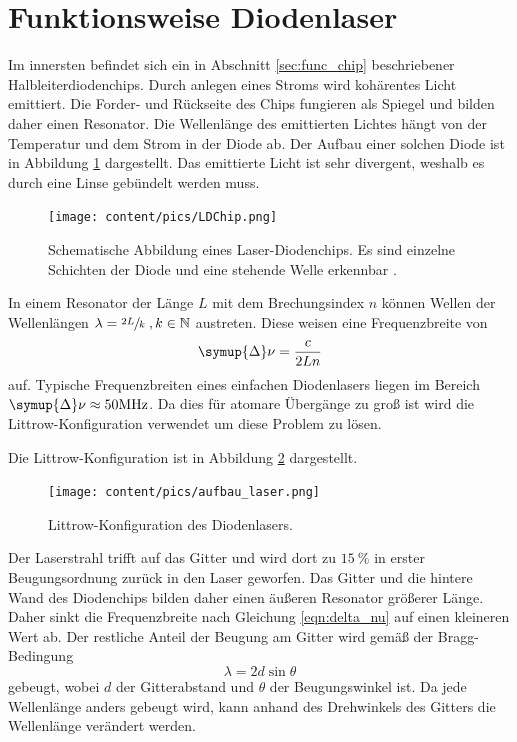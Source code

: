 \section{Funktionsweise Diodenlaser}
\label{sec:func_dio}

Im innersten befindet sich ein in Abschnitt \ref{sec:func_chip} beschriebener Halbleiterdiodenchips. Durch anlegen eines Stroms wird kohärentes Licht emittiert. Die Forder- und 
Rückseite des Chips fungieren als Spiegel und bilden daher einen Resonator. Die Wellenlänge des emittierten Lichtes hängt von der Temperatur und dem Strom in der Diode ab. Der
Aufbau einer solchen Diode ist in Abbildung \ref{fig:LDChip} dargestellt. Das emittierte Licht ist sehr divergent, weshalb es durch eine Linse gebündelt werden muss. 

\begin{figure}
    \centering
    \texttt{[image: content/pics/LDChip.png]}
    \caption{Schematische Abbildung eines Laser-Diodenchips. Es sind einzelne Schichten der Diode und eine stehende Welle erkennbar \cite{diode_laser_spectroscopy}.}
    \label{fig:LDChip}
\end{figure}

In einem Resonator der Länge $L$ mit dem Brechungsindex $n$ können Wellen der Wellenlängen $\lambda = \sfrac{2L}{k}  \;,k \in \mathbb{N}$ austreten. Diese weisen eine Frequenzbreite 
von 
\begin{equation}
    \label{eqn:delta_nu}
    \symup{\Delta} \nu = \frac{c}{2Ln}
\end{equation}
auf. Typische Frequenzbreiten eines einfachen Diodenlasers liegen im Bereich $\symup{\Delta} \nu \approx 50 \unit{\mega\hertz}$. Da dies für atomare Übergänge zu groß ist wird 
die Littrow-Konfiguration verwendet um diese Problem zu lösen. 

Die Littrow-Konfiguration ist in Abbildung \ref{fig:littrow} dargestellt.
\begin{figure}
    \centering
    \texttt{[image: content/pics/aufbau\_laser.png]}
    \caption{Littrow-Konfiguration des Diodenlasers. \cite{diode_laser_spectroscopy}}
    \label{fig:littrow}
\end{figure}
Der Laserstrahl trifft auf das Gitter und wird dort zu $\qty{15}{\percent}$ in erster Beugungsordnung zurück in den Laser geworfen. Das Gitter und die hintere Wand des Diodenchips 
bilden daher einen äußeren Resonator größerer Länge. Daher sinkt die Frequenzbreite nach Gleichung \ref{eqn:delta_nu} auf einen kleineren Wert ab. Der restliche Anteil der Beugung am 
Gitter wird gemäß der Bragg-Bedingung 
\begin{equation}
    \label{eqn:Bragg}
    \lambda = 2d \sin\theta
\end{equation}
gebeugt, wobei $d$ der Gitterabstand und $\theta$ der Beugungswinkel ist. Da jede Wellenlänge anders gebeugt wird, kann anhand des Drehwinkels des Gitters die Wellenlänge verändert 
werden. 

